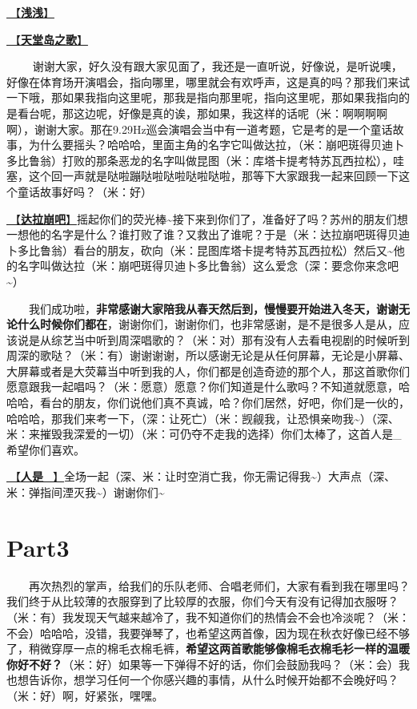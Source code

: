\documentclass[]{ctexbook}
\begin{document}
\hyperref[qianqian]{🎵【\textbf{浅浅}】}

\hyperref[haven-song]{🎵【\textbf{天堂岛之歌}】}

   谢谢大家，好久没有跟大家见面了，我还是一直听说，好像说，是听说噢，好像在体育场开演唱会，指向哪里，哪里就会有欢呼声，这是真的吗？那我们来试一下哦，那如果我指向这里呢，那我是指向那里呢，指向这里呢，那如果我指向的是看台呢，那这边呢，好像是真的诶，那如果，我这样的话呢（米：啊啊啊啊啊），谢谢大家。那在9.29Hz巡会演唱会当中有一道考题，它是考的是一个童话故事，为什么要摇头？哈哈哈，里面主角的名字它叫做达拉，（米：崩吧斑得贝迪卜多比鲁翁）打败的那条恶龙的名字叫做昆图（米：库塔卡提考特苏瓦西拉松），哇塞，这个回一声就是哒啦蹦哒啦哒啦哒啦哒啦，那等下大家跟我一起来回顾一下这个童话故事好吗？（米：好）

\hyperref[dalabengba]{🎵【\textbf{达拉崩吧}】}摇起你们的荧光棒\textasciitilde 接下来到你们了，准备好了吗？苏州的朋友们想一想他的名字是什么？谁打败了谁？又救出了谁呢？于是（米：达拉崩吧斑得贝迪卜多比鲁翁）看台的朋友，砍向（米：昆图库塔卡提考特苏瓦西拉松）然后又\textasciitilde 他的名字叫做达拉（米：崩吧斑得贝迪卜多比鲁翁）这么爱念（深：要念你来念吧\textasciitilde）

  我们成功啦，\textbf{非常感谢大家陪我从春天然后到，慢慢要开始进入冬天，谢谢无论什么时候你们都在}，谢谢你们，谢谢你们，也非常感谢，是不是很多人是从，应该说是从综艺当中听到周深唱歌的？（米：对）那有没有人去看电视剧的时候听到周深的歌哒？（米：有）谢谢谢谢，所以感谢无论是从任何屏幕，无论是小屏幕、大屏幕或者是大荧幕当中听到我的人，你们都是创造奇迹的那个人，那这首歌你们愿意跟我一起唱吗？（米：愿意）愿意？你们知道是什么歌吗？不知道就愿意，哈哈哈，看台的朋友，你们说他们真不真诚，哈？你们居然，好吧，你们是一伙的，哈哈哈，那我们来考一下，（深：让死亡）（米：觊觎我，让恐惧亲吻我\textasciitilde）（深、米：来摧毁我深爱的一切）（米：可仍夺不走我的选择）你们太棒了，这首人是\_希望你们喜欢。

\hyperref[renshi]{🎵【\textbf{人是\_}】}全场一起（深、米：让时空消亡我，你无需记得我\textasciitilde）大声点（深、米：弹指间湮灭我\textasciitilde）谢谢你们\textasciitilde{}

\section{Part3}\label{suzhou-20241109-part3}

  再次热烈的掌声，给我们的乐队老师、合唱老师们，大家有看到我在哪里吗？我们终于从比较薄的衣服穿到了比较厚的衣服，你们今天有没有记得加衣服呀？（米：有）我发现天气越来越冷了，我不知道你们的热情会不会也冷淡呢？（米：不会）哈哈哈，没错，我要弹琴了，也希望这两首像，因为现在秋衣好像已经不够了，稍微穿厚一点的棉毛衣棉毛裤，\textbf{希望这两首歌能够像棉毛衣棉毛衫一样的温暖你好不好？}（米：好）如果等一下弹得不好的话，你们会鼓励我吗？（米：会）我也想告诉你，想学习任何一个你感兴趣的事情，从什么时候开始都不会晚好吗？（米：好）啊，好紧张，嘿嘿。
\end{document}
